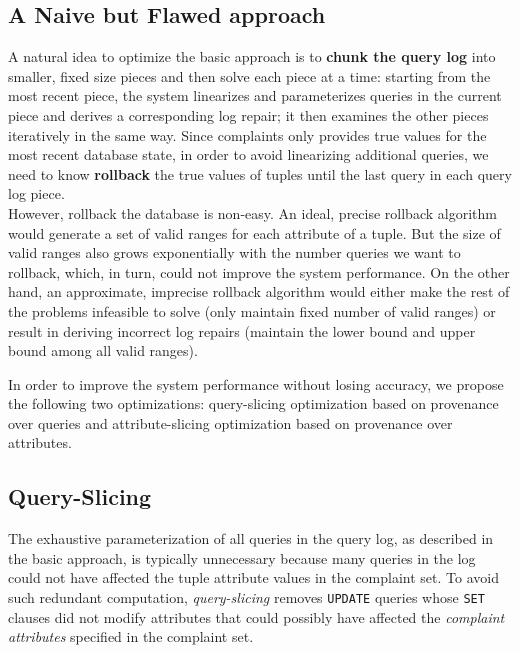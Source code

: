 \subsection{A Naive but Flawed approach}
A natural idea to optimize the basic approach is 
to \textbf{chunk the query log} into
smaller, fixed size pieces and then solve each piece at a time: starting
from the most recent piece, the system linearizes and parameterizes queries 
in the current piece and derives a corresponding log repair; 
it then examines the other pieces iteratively
in the same way. Since complaints only provides
true values for the most recent database state, in order to avoid 
linearizing additional queries, 
we need to know \textbf{rollback} the true values of tuples 
until the last query in each query log piece. \\
However, rollback the database is non-easy. An ideal, precise rollback
algorithm would generate a set of valid ranges for each attribute of a tuple. 
But the size of valid ranges also grows exponentially with the number queries
we want to rollback, which, in turn, could not improve the system performance. 
On the other hand, an approximate, imprecise 
rollback algorithm would either make the rest of the problems
infeasible to solve (only maintain fixed number of valid ranges) 
or result in deriving 
incorrect log repairs (maintain the lower 
bound and upper bound among all valid ranges).
  

In order to improve the system performance without losing accuracy, we propose
the following two optimizations: query-slicing optimization 
based on provenance over queries and
attribute-slicing optimization based on provenance over 
attributes. 

\subsection{Query-Slicing}
\label{sec:opt:query}
The exhaustive parameterization of all queries in the query log, as described
in the basic approach, is typically unnecessary because many queries in the log
could not have affected the tuple attribute values in the complaint set.
To avoid such redundant computation, \textit{query-slicing} 
removes \texttt{UPDATE} queries whose \texttt{SET} clauses did not modify 
attributes that could possibly have affected the {\it complaint attributes} 
specified in the complaint set.

